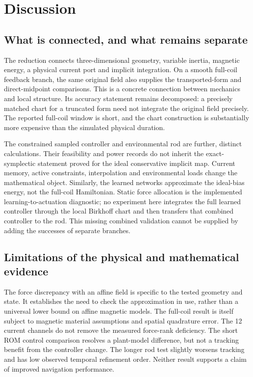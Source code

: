 \section{Discussion}
\subsection{What is connected, and what remains separate}
The reduction connects three-dimensional geometry, variable inertia, magnetic energy, a physical current port and implicit integration. On a smooth full-coil feedback branch, the same original field also supplies the transported-form and direct-midpoint comparisons. This is a concrete connection between mechanics and local structure. Its accuracy statement remains decomposed: a precisely matched chart for a truncated form need not integrate the original field precisely. The reported full-coil window is short, and the chart construction is substantially more expensive than the simulated physical duration.

The constrained sampled controller and environmental rod are further, distinct calculations. Their feasibility and power records do not inherit the exact-symplectic statement proved for the ideal conservative implicit map. Current memory, active constraints, interpolation and environmental loads change the mathematical object. Similarly, the learned networks approximate the ideal-bias energy, not the full-coil Hamiltonian. Static force allocation is the implemented learning-to-actuation diagnostic; no experiment here integrates the full learned controller through the local Birkhoff chart and then transfers that combined controller to the rod. This missing combined validation cannot be supplied by adding the successes of separate branches.

\subsection{Limitations of the physical and mathematical evidence}
The force discrepancy with an affine field is specific to the tested geometry and state. It establishes the need to check the approximation in use, rather than a universal lower bound on affine magnetic models. The full-coil result is itself subject to magnetic material assumptions and spatial quadrature error. The 12 current channels do not remove the measured force-rank deficiency. The short ROM control comparison resolves a plant-model difference, but not a tracking benefit from the controller change. The longer rod test slightly worsens tracking and has low observed temporal refinement order. Neither result supports a claim of improved navigation performance.

